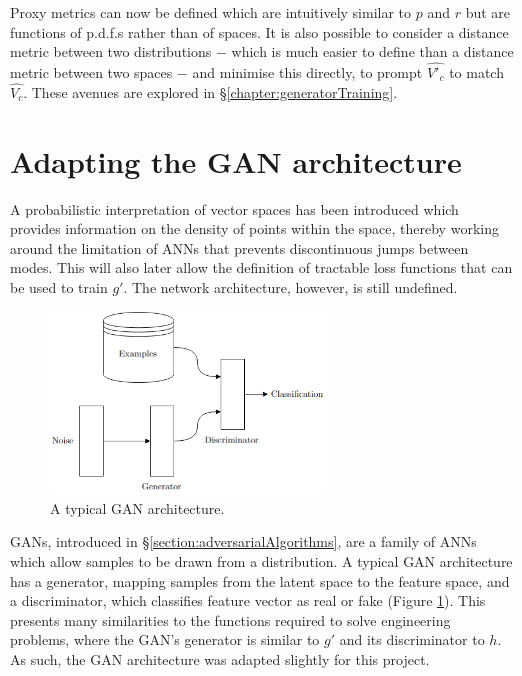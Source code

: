 \documentclass[../../main.tex]{subfiles}
\begin{document}
Proxy metrics can now be defined which are intuitively similar to $p$ and $r$ but are functions of p.d.f.s rather than of spaces.
It is also possible to consider a distance metric between two distributions $-$ which is much easier to define than a distance metric between two spaces $-$ and minimise this directly, to prompt $\hat{V'_c}$ to match $\hat{V_c}$.
These avenues are explored in \S\ref{chapter:generatorTraining}.

\section{Adapting the GAN architecture} \label{section:adaptingTheGANArchitecture}

A probabilistic interpretation of vector spaces has been introduced which provides information on the density of points within the space, thereby working around the limitation of ANNs that prevents discontinuous jumps between modes.
This will also later allow the definition of tractable loss functions that can be used to train $g'$.
The network architecture, however, is still undefined.
\begin{figure}[H]
    \begin{center}
    \includegraphics[width=0.65\textwidth]{ganArchitecture}
    \caption[Typical GAN architecture]{
		A typical GAN architecture.
    }
    \label{fig:ganArchitecture}
    \end{center}
\end{figure}
GANs, introduced in \S\ref{section:adversarialAlgorithms}, are a family of ANNs which allow samples to be drawn from a distribution.
A typical GAN architecture has a generator, mapping samples from the latent space to the feature space, and a discriminator, which classifies feature vector as real or fake (Figure \ref{fig:ganArchitecture}).
This presents many similarities to the functions required to solve engineering problems, where the GAN's generator is similar to $g'$ and its discriminator to $h$.
As such, the GAN architecture was adapted slightly for this project.
\end{document}
